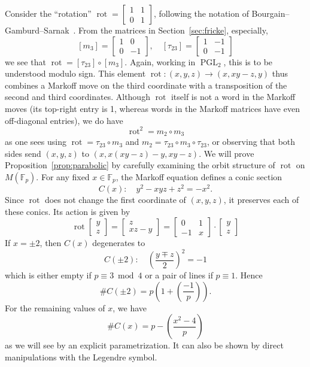 \documentclass[AHL, Unicode, longabstracts, published]{cedram}
\newcommand{\F}{\mathbb{F}}
\DeclareMathOperator{\PGL}{PGL}
\DeclareMathOperator{\rot}{rot}
\newcommand{\legendre}[2]{\genfrac{(}{)}{}{}{#1}{#2}}
\begin{document}
Consider the ``rotation'' $\rot=
\left[\begin{smallmatrix}1 & 1\\
0 & 1
\end{smallmatrix}\right]$, following the notation of Bourgain--Gamburd--Sarnak~\cite[p.~3]{BGS}. From the matrices in Section~\ref{sec:fricke}, especially,
\[
[m_3] =
\begin{bmatrix} 1 & 0 \\ 0 & -1
\end{bmatrix},\quad[\tau_{23}] =
\begin{bmatrix} 1 & -1 \\ 0 & -1
\end{bmatrix}
\]
we see that $\rot = [\tau_{23}] \circ [m_3]$. Again, working in $\PGL_2$, this is to be understood modulo sign. This element $\rot:(x,y,z)\to(x,xy-z,y)$ thus combines a Markoff move on the third coordinate with a transposition of the second and third coordinates. Although $\rot$ itself is not a word in the Markoff moves (its top-right entry is 1, whereas words in the Markoff matrices have even off-diagonal entries), we do have
\begin{equation}\label{eqn:rot-square}
\rot^2 = m_2 \circ m_3
\end{equation}
as one sees using $\rot = \tau_{23} \circ m_3$ and $m_2 = \tau_{23} \circ m_3 \circ \tau_{23}$, or observing that both sides send $(x,y,z)$ to $(x, x(xy-z)-y, xy-z)$. We will prove Proposition~\ref{prop:parabolic} by carefully examining the orbit structure of $\rot$ on $M(\F_{p})$. For any fixed $x \in \F_p$, the Markoff equation defines a conic section
\begin{equation}
C(x): \quad y^2 - xyz + z^2 = -x^2.
\end{equation}
Since $\rot$ does not change the first coordinate of $(x,y,z)$, it preserves each of these conics. Its action is given by
\begin{equation}
\rot
\begin{bmatrix} y \\ z
\end{bmatrix} =
\begin{bmatrix} z \\ xz - y
\end{bmatrix} =
\begin{bmatrix} 0 & 1 \\ -1 & x
\end{bmatrix} \cdot
\begin{bmatrix} y \\ z
\end{bmatrix}
\end{equation}
If $x = \pm 2$, then $C(x)$ degenerates to
\[
C(\pm 2): \quad \left(\frac{y \mp z}{2} \right)^2 = - 1
\]
which is either empty if $p \equiv 3 \bmod 4$ or a pair of lines if $p \equiv 1$. Hence
\[
\# C(\pm 2) = p \left(1 + \legendre{-1}{p} \right).
\]
For the remaining values of $x$, we have
\[
\# C(x) = p - \legendre{x^2-4}{p}
\]
as we will see by an explicit parametrization. It can also be shown by direct manipulations with the Legendre symbol.
\end{document}
